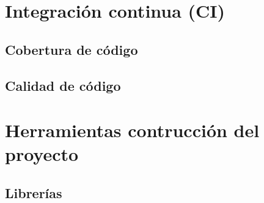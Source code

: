 \section{Integración continua (CI)}
\subsection{Cobertura de código}
\subsection{Calidad de código}
\section{Herramientas contrucción del proyecto}
\subsection{Librerías}



